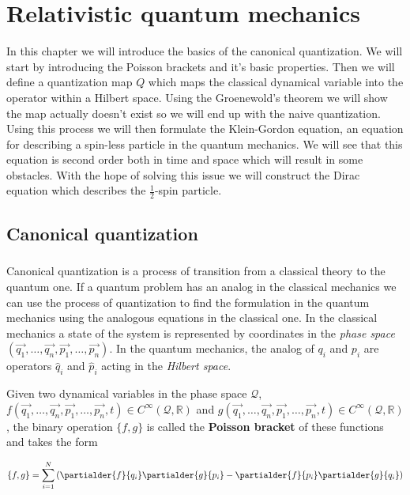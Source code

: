 \chapter{Relativistic quantum mechanics}

In this chapter we will introduce the basics of the canonical quantization. We will start by introducing the
Poisson brackets and it's basic properties. Then we will define a quantization map $Q$ which maps the
classical dynamical variable into the operator within a Hilbert space. Using the Groenewold's theorem we
will show the map actually doesn't exist so we will end up with the naive quantization. Using this process we will then
formulate the Klein-Gordon equation, an equation for describing a spin-less particle in the quantum mechanics.
We will see that this equation is second order both in time and space which will result in some obstacles. With the
hope of solving this issue we will construct the Dirac equation which describes the $\frac{1}{2}$-spin particle.

\section{Canonical quantization}

\paragraph{} Canonical quantization is a process of transition from a classical theory to the quantum one. If a 
quantum problem has an analog in the classical mechanics we can use the process of quantization to find the formulation
in the quantum mechanics using the analogous equations in the classical one. In the classical mechanics a state of the system
is represented by coordinates in the \textit{phase space} $(\vec{q_{1}}, \dots, \vec{q_{n}}, \vec{p_{1}}, \dots, \vec{p_{n}})$.
In the quantum mechanics, the analog of $q_{i}$ and $p_{i}$ are operators $\hat{q}_{i}$ and $\hat{p}_{i}$ acting in the 
\textit{Hilbert space}.

\begin{definition}
    \label{df:poisson}
    Given two dynamical variables in the phase space $\mathcal{Q}$, \newline $f(\vec{q_{1}}, \dots, \vec{q_{n}}, \vec{p_{1}}, \dots, \vec{p_{n}}, t) 
    \in C^{\infty}(\mathcal{Q}, \mathbb{R})$ and $g(\vec{q_{1}}, \dots, \vec{q_{n}}, \vec{p_{1}}, \dots, \vec{p_{n}}, t) 
    \in C^{\infty}(\mathcal{Q}, \mathbb{R})$, the binary operation $\{f, g\}$ is called the \textbf{Poisson bracket} of these functions and takes the form

    \begin{equation}
        \{f, g\} = \sum_{i=1}^{N}\left(\partialder{f}{q_{i}} \partialder{g}{p_{i}} - \partialder{f}{p_{i}} \partialder{g}{q_{i}}\right)
    \end{equation}
\end{definition}

